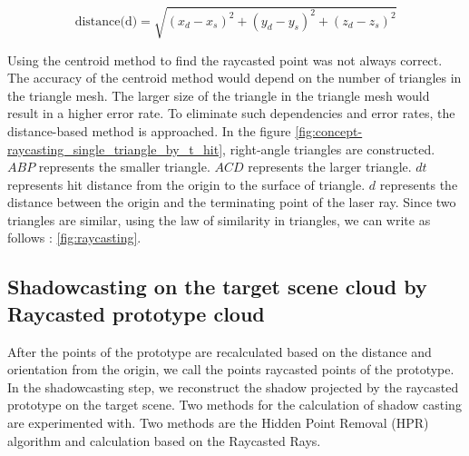 \begin{equation}\label{eq:distance}
\text{distance(d)} = \sqrt{{(x_d - x_s)}^2 + {(y_d - y_s)}^2 + {(z_d - z_s)}^2}
\end{equation}

Using the centroid method to find the raycasted point was not always correct. The accuracy of the centroid method would depend on the number of triangles in the triangle mesh. The larger size of the triangle in the triangle mesh would result in a higher error rate. To eliminate such dependencies and error rates, the distance-based method is approached.  
In the figure \ref{fig:concept-raycasting_single_triangle_by_t_hit}, right-angle triangles are constructed. \(ABP\) represents the smaller triangle. \(ACD\) represents the larger triangle. \(dt\) represents hit distance from the origin to the surface of triangle. \(d\) represents the distance between the origin and the terminating point of the laser ray. Since two triangles are similar, using the law of similarity in triangles, we can write as follows : \ref{fig:raycasting}. 

\subsection{Shadowcasting on the target scene cloud by Raycasted prototype cloud}

After the points of the prototype are recalculated based on the distance and orientation from the origin, we call the points raycasted points of the prototype. In the shadowcasting step, we reconstruct the shadow projected by the raycasted prototype on the target scene. Two methods for the calculation of shadow casting are experimented with. Two methods are the Hidden Point Removal (HPR) algorithm and calculation based on the Raycasted Rays.


